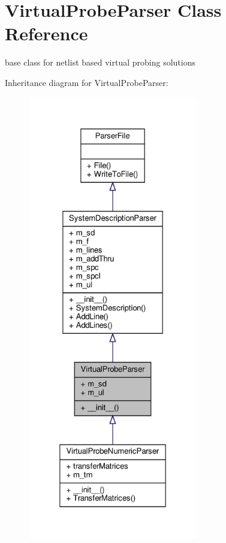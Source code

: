 \hypertarget{classSignalIntegrity_1_1Parsers_1_1VirtualProbeParser_1_1VirtualProbeParser}{}\section{Virtual\+Probe\+Parser Class Reference}
\label{classSignalIntegrity_1_1Parsers_1_1VirtualProbeParser_1_1VirtualProbeParser}


base class for netlist based virtual probing solutions  




Inheritance diagram for Virtual\+Probe\+Parser\+:
\nopagebreak
\begin{figure}[H]
\begin{center}
\leavevmode
\includegraphics[height=550pt]{classSignalIntegrity_1_1Parsers_1_1VirtualProbeParser_1_1VirtualProbeParser__inherit__graph}
\end{center}
\end{figure}


